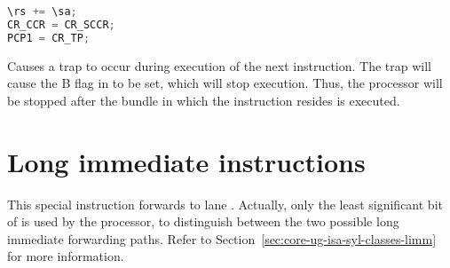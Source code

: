 \begin{lstlisting}[numbers=none, basicstyle=\ttfamily\footnotesize, language=C++]
\rs += \sa;
CR_CCR = CR_SCCR;
PCP1 = CR_TP;
\end{lstlisting}

Causes a  trap to occur during execution of the next instruction.
The  trap will cause the B flag in  to be set, which will
stop execution. Thus, the processor will be stopped after the bundle in which
the  instruction resides is executed.

\section{Long immediate instructions}

\noasm{}
This special instruction forwards \code{\li} to lane \code{\lt}. Actually, only
the least significant bit of \code{\lt} is used by the processor, to distinguish
between the two possible long immediate forwarding paths. Refer to
Section~\ref{sec:core-ug-isa-syl-classes-limm} for more information.
